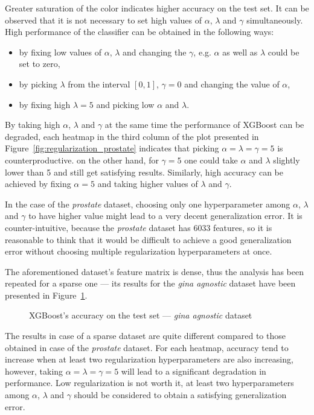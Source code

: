 \documentclass[magisterska, english]{pwr_wmat_praca_dyplomowa}
\theoremstyle{plain}
\numberwithin{theorem}{chapter}
\theoremstyle{definition}
\numberwithin{theorem}{chapter}
\begin{document}
Greater saturation of the color indicates higher accuracy on the test set. It can be observed that it is not necessary to set high values of $\alpha$, $\lambda$ and $\gamma$ simultaneously. High performance of the classifier can be obtained in the following ways:
\begin{itemize}
    \item by fixing low values of $\alpha$, $\lambda$ and changing the $\gamma$, e.g. $\alpha$ as well as $\lambda$ could be set to zero,
    \item by picking $\lambda$ from the interval $[0, 1]$, $\gamma=0$ and changing the value of $\alpha$,
    \item by fixing high $\lambda=5$ and picking low $\alpha$ and $\lambda$.
\end{itemize}

By taking high $\alpha$, $\lambda$ and $\gamma$ at the same time the performance of XGBoost can be degraded, each heatmap in the third column of the plot presented in Figure~\ref{fig:regularization_prostate} indicates that picking $\alpha=\lambda=\gamma=5$ is counterproductive. on the other hand, for $\gamma=5$ one could take $\alpha$ and $\lambda$ slightly lower than 5 and still get satisfying results. Similarly, high accuracy can be achieved by fixing $\alpha=5$ and taking higher values of $\lambda$ and $\gamma$.

In the case of the \emph{prostate} dataset, choosing only one hyperparameter among $\alpha$, $\lambda$ and $\gamma$ to have higher value might lead to a very decent generalization error. It is counter-intuitive, because the \emph{prostate} dataset has 6033 features, so it is reasonable to think that it would be difficult to achieve a good generalization error without choosing multiple regularization hyperparameters at once.

The aforementioned dataset's feature matrix is dense, thus the analysis has been repeated for a sparse one --- its results for the \emph{gina agnostic} dataset have been presented in Figure~\ref{fig:regularization_gina_agnostic}.

\begin{figure}[H]
	\centering
	\caption{XGBoost's accuracy on the test set --- \emph{gina agnostic} dataset}
	\label{fig:regularization_gina_agnostic}
\end{figure}

The results in case of a sparse dataset are quite different compared to those obtained in case of the \emph{prostate} dataset. For each heatmap, accuracy tend to increase when at least two regularization hyperparameters are also increasing, however, taking $\alpha=\lambda=\gamma=5$ will lead to a significant degradation in performance. Low regularization is not worth it, at least two hyperparameters among $\alpha$, $\lambda$ and $\gamma$ should be considered to obtain a satisfying generalization error.
\end{document}
